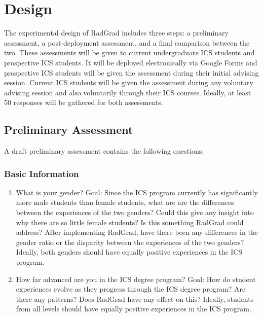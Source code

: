 \chapter{Design}
\label{design}
The experimental design of RadGrad includes three steps: a preliminary assessment, a post-deployment assessment, and a final comparison between the two. These assessments will be given to current undergraduate ICS students and prospective ICS students. It will be deployed electronically via Google Forms and prospective ICS students will be given the assessment during their initial advising session. Current ICS students will be given the assessment during any voluntary advising session and also voluntarily through their ICS courses. Ideally, at least 50 responses will be gathered for both assessments.
\section{Preliminary Assessment}
\label{preliminaryAssessment}
	A draft preliminary assessment contains the following questions:

\subsection{Basic Information}
\begin{enumerate}
\item What is your gender? 
Goal: Since the ICS program currently has significantly more male students than female students, what are are the differences between the experiences of the two genders? Could this give any insight into why there are so little female students? Is this something RadGrad could address? After implementing RadGrad, have there been any differences in the gender ratio or the disparity between the experiences of the two genders? Ideally, both genders should have equally positive experiences in the ICS program.
\item How far advanced are you in the ICS degree program?
Goal: How do student experiences evolve as they progress through the ICS degree program? Are there any patterns? Does RadGrad have any effect on this? Ideally, students from all levels should have equally positive experiences in the ICS program. 
\end{enumerate}

